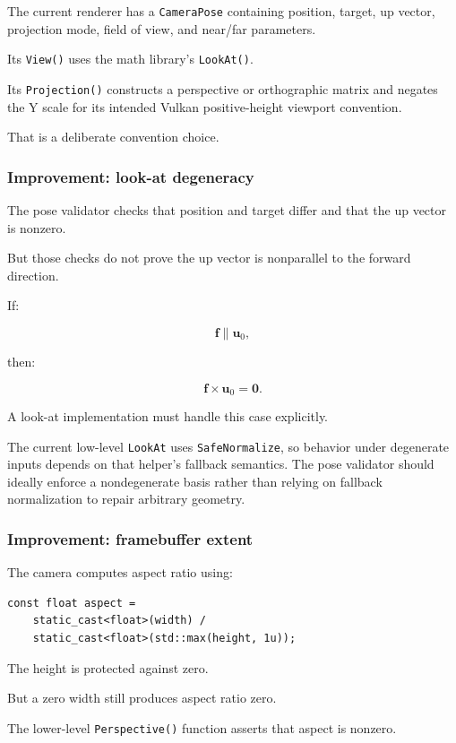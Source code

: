 The current renderer has a \texttt{CameraPose} containing position, target, up vector, projection mode, field of view, and near/far parameters.

Its \texttt{View()} uses the math library's \texttt{LookAt()}.

Its \texttt{Projection()} constructs a perspective or orthographic matrix and negates the Y scale for its intended Vulkan positive-height viewport convention.

That is a deliberate convention choice.

\subsubsection{Improvement: look-at degeneracy}\label{improvement-look-at-degeneracy}

The pose validator checks that position and target differ and that the up vector is nonzero.

But those checks do not prove the up vector is nonparallel to the forward direction.

If:

\[
 \mathbf f\parallel\mathbf u_0,
\]

then:

\[
 \mathbf f\times\mathbf u_0=\mathbf0.
\]

A look-at implementation must handle this case explicitly.

The current low-level \texttt{LookAt} uses \texttt{SafeNormalize}, so behavior under degenerate inputs depends on that helper's fallback semantics. The pose validator should ideally enforce a nondegenerate basis rather than relying on fallback normalization to repair arbitrary geometry.

\subsubsection{Improvement: framebuffer extent}\label{improvement-framebuffer-extent}

The camera computes aspect ratio using:

\begin{verbatim}
const float aspect =
    static_cast<float>(width) /
    static_cast<float>(std::max(height, 1u));
\end{verbatim}

The height is protected against zero.

But a zero width still produces aspect ratio zero.

The lower-level \texttt{Perspective()} function asserts that aspect is nonzero.

